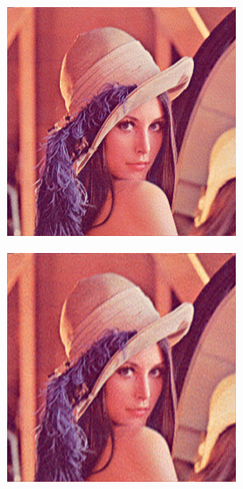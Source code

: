 \documentclass[11pt]{report}
\theoremstyle{plain}
\theoremstyle{remark}
\begin{document}
\pagebreak
{}
\begin{figure}
	\centering
	\begin{subfigure}[b]{0.24\textwidth}
		\centering
		\includegraphics[width=\textwidth]{plaatjes/Lenna_fourier_0_2.png}
	\end{subfigure}
	\begin{subfigure}[b]{0.24\textwidth}
		\centering
		\includegraphics[width=\textwidth]{plaatjes/Lenna_fourier_0_1.png}

\end{subfigure}
\end{figure}
\end{document}
